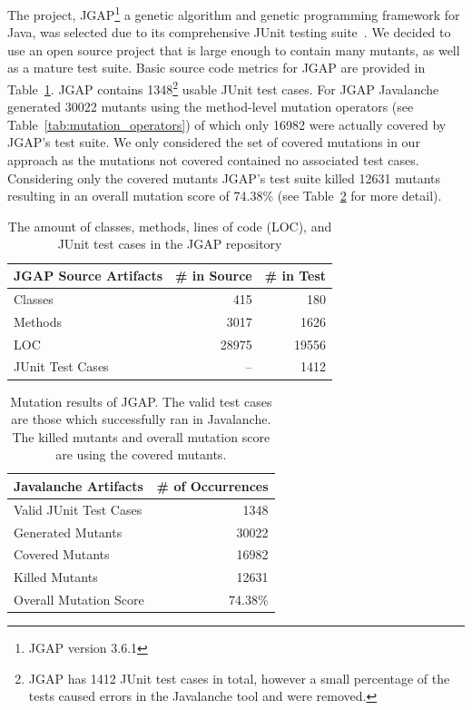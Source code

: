 \documentclass[conference]{IEEEtran}
\begin{document}
The project, JGAP\footnote{JGAP version 3.6.1} a genetic algorithm and genetic programming framework for Java, was selected due to its comprehensive JUnit testing suite~\cite{JGAP}. We decided to use an open source project that is large enough to contain many mutants, as well as a mature test suite. Basic source code metrics for JGAP are provided in Table~\ref{tab:jgap_source_stats}. 
JGAP contains 1348\footnote{JGAP has 1412 JUnit test cases in total, however a small percentage of the tests caused errors in the Javalanche tool and were removed.} usable JUnit test cases. For JGAP Javalanche generated 30022 mutants using the method-level mutation operators (see Table~\ref{tab:mutation_operators}) of which only 16982 were actually covered by JGAP's test suite. We only considered the set of covered mutations in our approach as the mutations not covered contained no associated test cases. Considering only the covered mutants JGAP's test suite killed 12631 mutants resulting in an overall mutation score of 74.38\% (see Table~\ref{tab:jgap_mutation_stats} for more detail).

\begin{table}[!t]
  \centering
  \begin{tabular}{|l|r|r|}
    \hline
    \rowcolor[RGB]{169,196,223}
    \textbf{JGAP Source Artifacts} & \textbf{\# in Source} & \textbf{\# in Test} \\
    \hline Classes & 415 & 180 \\
    \hline Methods & 3017 & 1626 \\
    \hline LOC & 28975 & 19556 \\
    \hline JUnit Test Cases & -- & 1412\footnotemark[6] \\
    \hline
  \end{tabular}
  \caption{The amount of classes, methods, lines of code (LOC), and JUnit test cases in the JGAP repository}
  \label{tab:jgap_source_stats}
\end{table}

\begin{table}[!t]
  \centering
  \begin{tabular}{|l|r|}
    \hline
    \rowcolor[RGB]{169,196,223}
    \textbf{Javalanche Artifacts} & \textbf{\# of Occurrences} \\
    \hline Valid JUnit Test Cases & 1348\footnotemark[6] \\
    \hline Generated Mutants & 30022 \\
    \hline Covered Mutants & 16982 \\
    \hline Killed Mutants & 12631 \\
    \hline Overall Mutation Score & 74.38\% \\
    \hline
  \end{tabular}
  \caption{Mutation results of JGAP. The valid test cases are those which successfully ran in Javalanche. The killed mutants and overall mutation score are using the covered mutants.}
  \label{tab:jgap_mutation_stats}
\end{table}
\end{document}
